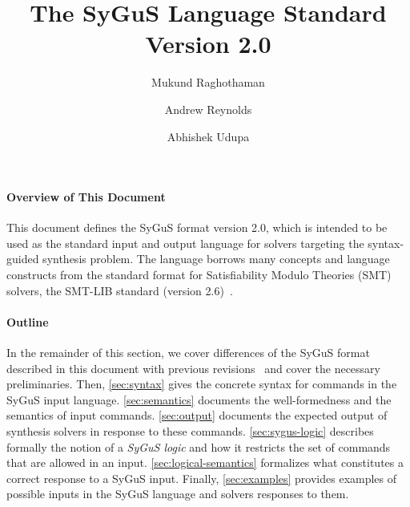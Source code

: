 \documentclass[english,a4paper,10pt]{article}
\begin{document}
\title{The SyGuS Language Standard Version 2.0}

\author{Mukund Raghothaman \and Andrew Reynolds \and Abhishek Udupa}

\maketitle







\paragraph{Overview of This Document}
This document defines the SyGuS format version 2.0,
which is intended to be used as the standard input and output language
for solvers targeting the syntax-guided synthesis problem.
The language borrows many concepts and language constructs
from the standard format for Satisfiability Modulo Theories (SMT)
solvers, the SMT-LIB standard (version 2.6)~\cite{BarFT-RR-17}.

\begin{comment}
We would like to thank the following people for their helpful
suggestions and feedback regarding this document (listed alphabetically):
Haniel Barbosa,
Andres N\"otzli,
Saswat Padhi,
Rishabh Singh,
Cesare Tinelli.
\end{comment}

\paragraph{Outline}
In the remainder of this section, we cover differences of
the SyGuS format described in this document with previous revisions~\cite{sygusFormat,sygusSyntax2015,sygusSyntax2016}
and cover the necessary preliminaries.
Then,
\cref{sec:syntax}
gives the concrete syntax for commands in the SyGuS input language.
\cref{sec:semantics}
documents the well-formedness and the semantics of input commands.
\cref{sec:output}
documents the expected output of synthesis solvers in response to these commands.
\cref{sec:sygus-logic}
describes formally the notion of a \emph{SyGuS logic} and how it restricts
the set of commands that are allowed in an input.
\cref{sec:logical-semantics}
formalizes what constitutes a correct response to a SyGuS input.
Finally, \cref{sec:examples}
provides examples of possible inputs in the SyGuS language
and solvers responses to them.
\end{document}
